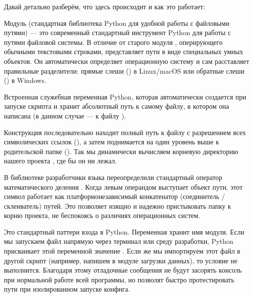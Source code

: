 Давай детально разберём, что здесь происходит и как это работает:
\begin{syntaxdesc}
    \item[Импорт библиотеки путей (строка 1) \mycode{from pathlib import Path}] Модуль  (стандартная библиотека Python для удобной работы с файловыми путями) --- это современный стандартный инструмент Python для работы с путями файловой системы. В отличие от старого модуля , оперирующего обычными текстовыми строками,  представляет пути в виде специальных умных объектов. Он автоматически определяет операционную систему и сам расставляет правильные разделители: прямые слеши (\mycode{/}) в Linux/macOS или обратные слеши (\mycode{\textbackslash\textbackslash}) в Windows.
    \item[Локатор текущего скрипта (строка 4) \mycode{__file__}] Встроенная служебная переменная Python, которая автоматически создается при запуске скрипта и хранит абсолютный путь к самому файлу, в котором она написана (в данном случае --- к файлу ).
    \item[Вычисление корня проекта (строка 4) \mycode{Path(__file__).resolve().parent}] Конструкция последовательно находит полный путь к файлу с разрешением всех символических ссылок (), а затем поднимается на один уровень выше к родительской папке (). Так мы динамически вычисляем корневую директорию нашего проекта , где бы он ни лежал.
    \item[Оператор деления путей (строка 6) \mycode{BASE_DIR / "data"}] В библиотеке  разработчики языка переопределили стандартный оператор математического деления \mycode{/}. Когда левым операндом выступает объект пути, этот символ работает как платформонезависимый конкатенатор (соединитель / склеиватель) путей. Это позволяет изящно и надежно пристыковать папку  к корню проекта, не беспокоясь о различиях операционных систем.
    \item[Точка входа модуля (строка 8) \mycode{if __name__ == "__main__":}] Это стандартный паттерн входа в Python. Переменная  хранит имя модуля. Если мы запускаем файл  напрямую через терминал или среду разработки, Python присваивает этой переменной значение . Если же мы импортируем этот файл в другой скрипт (например, напишем  в модуле загрузки данных), то условие не выполнится. Благодаря этому отладочные сообщения не будут засорять консоль при нормальной работе всей программы, но позволят быстро протестировать пути при изолированном запуске конфига.

\end{syntaxdesc}
